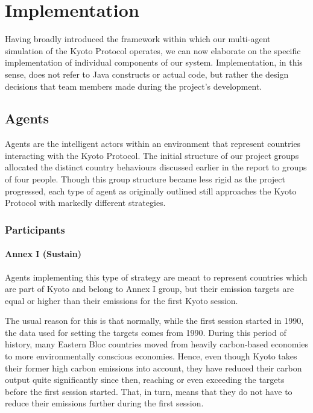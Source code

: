 \section{Implementation}

Having broadly introduced the framework within which our multi-agent simulation of the Kyoto Protocol operates, we can now elaborate on the specific implementation of individual components of our system. Implementation, in this sense, does not refer to Java constructs or actual code, but rather the design decisions that team members made during the project's development.

\subsection{Agents}

Agents are the intelligent actors within an environment that represent countries interacting with the Kyoto Protocol. The initial structure of our project groups allocated the distinct country behaviours discussed earlier in the report to groups of four people. Though this group structure became less rigid as the project progressed, each type of agent as originally outlined still approaches the Kyoto Protocol with markedly different strategies.

\subsubsection{Participants}

\paragraph{Annex I (Sustain)}

Agents implementing this type of strategy are meant to represent countries which are part of Kyoto and belong to Annex I group, but their emission targets are equal or higher than their emissions for the first Kyoto session.

The usual reason for this is that normally, while the first session started in 1990, the data used for setting the targets comes from 1990. During this period of history, many Eastern Bloc countries moved from heavily carbon-based economies to more environmentally conscious economies. Hence, even though Kyoto takes their former high carbon emissions into account, they have reduced their carbon output quite significantly since then, reaching or even exceeding the targets before the first session started. That, in turn, means that they do not have to reduce their emissions further during the first session.

